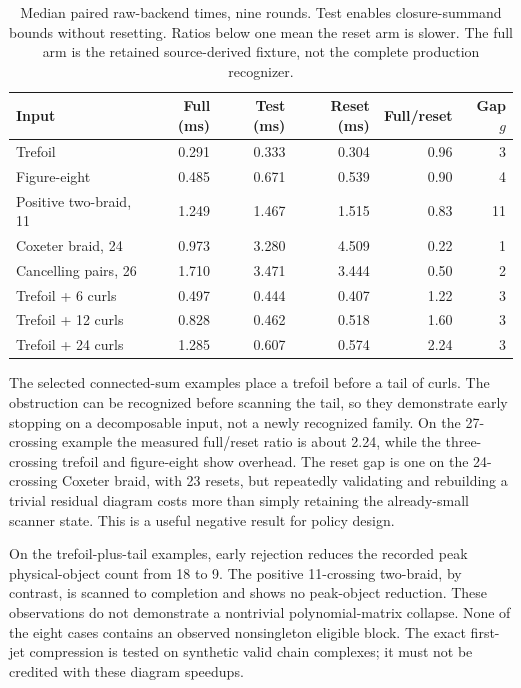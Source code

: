 \documentclass[11pt]{article}
\theoremstyle{definition}\newtheorem{definition}[theorem]{Definition}\newtheorem{example}[theorem]{Example}
\theoremstyle{remark}\newtheorem{remark}[theorem]{Remark}
\newcommand{\TailRatio}{2.24}
\newcommand{\TailPeakFull}{18}
\newcommand{\TailPeakReset}{9}
\begin{document}
\begin{table}[htbp]
\centering\small
\begin{tabular}{@{}lrrrrr@{}}
\toprule
Input & Full (ms) & Test (ms) & Reset (ms) & Full/reset & Gap $g$\\
\midrule
Trefoil & 0.291 & 0.333 & 0.304 & 0.96 & 3\\
Figure-eight & 0.485 & 0.671 & 0.539 & 0.90 & 4\\
Positive two-braid, 11 & 1.249 & 1.467 & 1.515 & 0.83 & 11\\
Coxeter braid, 24 & 0.973 & 3.280 & 4.509 & 0.22 & 1\\
Cancelling pairs, 26 & 1.710 & 3.471 & 3.444 & 0.50 & 2\\
Trefoil + 6 curls & 0.497 & 0.444 & 0.407 & 1.22 & 3\\
Trefoil + 12 curls & 0.828 & 0.462 & 0.518 & 1.60 & 3\\
Trefoil + 24 curls & 1.285 & 0.607 & 0.574 & 2.24 & 3\\
\bottomrule
\end{tabular}
\caption{Median paired raw-backend times, nine rounds. Test enables closure-summand bounds without resetting. Ratios below one mean the reset arm is slower. The full arm is the retained source-derived fixture, not the complete production recognizer.}
\label{tab:benchmark}
\end{table}


The selected connected-sum examples place a trefoil before a tail of curls. The obstruction can be recognized before scanning the tail, so they demonstrate early stopping on a decomposable input, not a newly recognized family. On the 27-crossing example the measured full/reset ratio is about \TailRatio{}, while the three-crossing trefoil and figure-eight show overhead. The reset gap is one on the 24-crossing Coxeter braid, with 23 resets, but repeatedly validating and rebuilding a trivial residual diagram costs more than simply retaining the already-small scanner state. This is a useful negative result for policy design.

On the trefoil-plus-tail examples, early rejection reduces the recorded peak physical-object count from \TailPeakFull{} to \TailPeakReset{}. The positive 11-crossing two-braid, by contrast, is scanned to completion and shows no peak-object reduction. These observations do not demonstrate a nontrivial polynomial-matrix collapse. None of the eight cases contains an observed nonsingleton eligible block. The exact first-jet compression is tested on synthetic valid chain complexes; it must not be credited with these diagram speedups.
\end{document}
